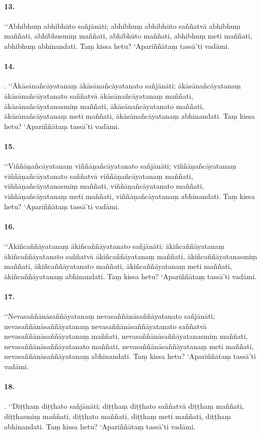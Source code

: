 \paragraph{13.} ‘‘Abhibhuṃ abhibhūto sañjānāti; abhibhuṃ abhibhūto saññatvā abhibhuṃ maññati, abhibhusmiṃ maññati, abhibhūto maññati, abhibhuṃ meti maññati, abhibhuṃ abhinandati. Taṃ kissa hetu? ‘Apariññātaṃ tassā’ti vadāmi.

\paragraph{14.} . ‘‘Ākāsānañcāyatanaṃ ākāsānañcāyatanato sañjānāti; ākāsānañcāyatanaṃ ākāsānañcāyatanato saññatvā ākāsānañcāyatanaṃ maññati, ākāsānañcāyatanasmiṃ maññati, ākāsānañcāyatanato maññati, ākāsānañcāyatanaṃ meti maññati, ākāsānañcāyatanaṃ abhinandati. Taṃ kissa hetu? ‘Apariññātaṃ tassā’ti vadāmi.

\paragraph{15.} ‘‘Viññāṇañcāyatanaṃ viññāṇañcāyatanato sañjānāti; viññāṇañcāyatanaṃ viññāṇañcāyatanato saññatvā viññāṇañcāyatanaṃ maññati, viññāṇañcāyatanasmiṃ maññati, viññāṇañcāyatanato maññati, viññāṇañcāyatanaṃ meti maññati, viññāṇañcāyatanaṃ abhinandati. Taṃ kissa hetu? ‘Apariññātaṃ tassā’ti vadāmi.

\paragraph{16.} ‘‘Ākiñcaññāyatanaṃ ākiñcaññāyatanato sañjānāti; ākiñcaññāyatanaṃ ākiñcaññāyatanato saññatvā ākiñcaññāyatanaṃ maññati, ākiñcaññāyatanasmiṃ maññati, ākiñcaññāyatanato maññati, ākiñcaññāyatanaṃ meti maññati, ākiñcaññāyatanaṃ abhinandati. Taṃ kissa hetu? ‘Apariññātaṃ tassā’ti vadāmi.

\paragraph{17.} ‘‘Nevasaññānāsaññāyatanaṃ nevasaññānāsaññāyatanato sañjānāti; nevasaññānāsaññāyatanaṃ nevasaññānāsaññāyatanato saññatvā nevasaññānāsaññāyatanaṃ maññati, nevasaññānāsaññāyatanasmiṃ maññati, nevasaññānāsaññāyatanato maññati, nevasaññānāsaññāyatanaṃ meti maññati, nevasaññānāsaññāyatanaṃ abhinandati. Taṃ kissa hetu? ‘Apariññātaṃ tassā’ti vadāmi.

\paragraph{18.} . ‘‘Diṭṭhaṃ diṭṭhato sañjānāti; diṭṭhaṃ diṭṭhato saññatvā diṭṭhaṃ maññati, diṭṭhasmiṃ maññati, diṭṭhato maññati, diṭṭhaṃ meti maññati, diṭṭhaṃ abhinandati. Taṃ kissa hetu? ‘Apariññātaṃ tassā’ti vadāmi.

